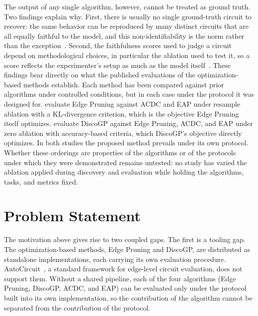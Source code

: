 The output of any single algorithm, however, cannot be treated as ground truth. Two findings explain why. First, there is usually no single ground-truth circuit to recover: the same behavior can be reproduced by many distinct circuits that are all equally faithful to the model, and this non-identifiability is the norm rather than the exception~\citep{meloux2025everything, chen2026rome}. Second, the faithfulness scores used to judge a circuit depend on methodological choices, in particular the ablation used to test it, so a score reflects the experimenter's setup as much as the model itself~\citep{miller2024transformer}. These findings bear directly on what the published evaluations of the optimization-based methods establish. Each method has been compared against prior algorithms under controlled conditions, but in each case under the protocol it was designed for. \citet{edgePruning} evaluate Edge Pruning against ACDC and EAP under resample ablation with a KL-divergence criterion, which is the objective Edge Pruning itself optimizes. \citet{yu-etal-2025-sheaf} evaluate DiscoGP against Edge Pruning, ACDC, and EAP under zero ablation with accuracy-based criteria, which DiscoGP's objective directly optimizes. In both studies the proposed method prevails under its own protocol. Whether these orderings are properties of the algorithms or of the protocols under which they were demonstrated remains untested: no study has varied the ablation applied during discovery and evaluation while holding the algorithms, tasks, and metrics fixed.

\section{Problem Statement}\label{sec:problem}

The motivation above gives rise to two coupled gaps. The first is a tooling gap. The optimization-based methods, Edge Pruning and DiscoGP, are distributed as standalone implementations, each carrying its own evaluation procedure. AutoCircuit~\citep{miller2024transformer}, a standard framework for edge-level circuit evaluation, does not support them. Without a shared pipeline, each of the four algorithms (Edge Pruning, DiscoGP, ACDC, and EAP) can be evaluated only under the protocol built into its own implementation, so the contribution of the algorithm cannot be separated from the contribution of the protocol.

